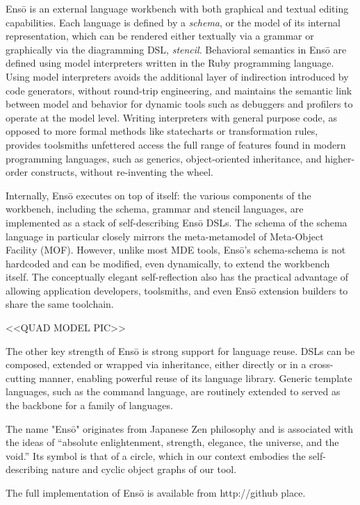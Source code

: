 \documentclass[11pt]{article}
\def\Enso{Ens\={o}\xspace}
\begin{document}
\Enso is an external language workbench with both graphical and textual editing capabilities. Each language is defined by a \emph{schema}, or the model of its internal representation, which can be rendered either textually via a grammar or graphically via the diagramming DSL, \emph{stencil}. Behavioral semantics in \Enso are defined using model interpreters written in the Ruby programming language. Using model interpreters avoids the additional layer of indirection introduced by code generators, without round-trip engineering, and maintains the semantic link between model and behavior for dynamic tools such as debuggers and profilers to operate at the model level. Writing interpreters with general purpose code, as opposed to more formal methods like statecharts or transformation rules, provides toolsmiths unfettered access the full range of features found in modern programming languages, such as generics, object-oriented inheritance, and higher-order constructs, without re-inventing the wheel.

Internally, \Enso executes on top of itself: the various components of the workbench, including the schema, grammar and stencil languages, are implemented as a stack of self-describing \Enso DSLs. The schema of the schema language in particular closely mirrors the meta-metamodel of Meta-Object Facility (MOF). However, unlike most MDE tools, \Enso's schema-schema is not hardcoded and can be modified, even dynamically, to extend the workbench itself. The conceptually elegant self-reflection also has the practical advantage of allowing application developers, toolsmiths, and even \Enso extension builders to share the same toolchain. 

<<QUAD MODEL PIC>>

The other key strength of \Enso is strong support for language reuse. DSLs can be composed, extended or wrapped via inheritance, either directly or in a cross-cutting manner, enabling powerful reuse of its language library. Generic template languages, such as the command language, are routinely extended to served as the backbone for a family of languages.

The name "\Enso" originates from Japanese Zen philosophy and is associated with the ideas of “absolute enlightenment, strength, elegance, the universe, and the void.” Its symbol is that of a circle, which in our context embodies the self-describing nature and cyclic object graphs of our tool.

The full implementation of \Enso is available from http://github place.
\end{document}

